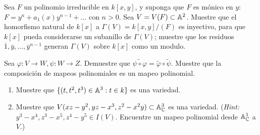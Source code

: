 \begin{sol}{2.4}

\end{sol}

\begin{prob}{2.5}
    Sea \(F\) un polinomio irreducible en \(k[x,y]\), y suponga que \(F\) es mónico en \(y\): \(F=y^n+a_1(x)y^{n-1}+\dots \) con \(n>0\). Sea \(V=V(F)\subset\mathbb{A}^2\). Muestre que el homorfismo natural de \(k[x]\) a \(\Gamma(V)=k[x,y]/(F)\) es inyectivo, para que \(k[x]\) pueda considerarse un subanillo de \(\Gamma(V)\); muestre que los residuos \(\overline{1},\overline{y},\dots ,\overline{y}^{n-1}\) generan \(\Gamma(V)\) sobre \(k[x]\) como un modulo.
\end{prob}

\begin{sol}{2.5}

\end{sol}

\begin{prob}{2.6}
    Sea \(\varphi:V\rightarrow W,\psi:W\rightarrow Z\). Demuestre que \(\widetilde{\psi\circ\varphi}=\widetilde{\varphi}\circ\widetilde{\psi}\). Muestre que la composición de mapeos polinomiales es un mapeo polinomial.
\end{prob}

\begin{sol}{2.6}

\end{sol}

\begin{prob}{2.8}
    \begin{enumerate}
        \item Muestre que \(\{(t,t^2,t^3)\in\mathbb{A}^3:t\in k\}\) es una variedad.
        \item Muestre que \(V(xz-y^2,yz-x^3,z^2-x^2y)\subset\mathbb{A}_{\mathbb{C}}^3\) es una variedad. (\textit{Hint:}\(y^3-x^4,z^3-x^5,z^4-y^5\in I(V)\). Encuentre un mapeo polinomial desde \(\mathbb{A}_{\mathbb{C}}^1\) a \(V\).)
    \end{enumerate}
\end{prob}

\begin{sol}{2.8}

\end{sol}

